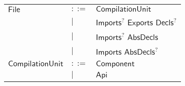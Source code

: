 







\begin{longtable}[l]{p{3cm}ll}
$\mathsf{File}$ &  $\mathsf{::=}$  & $\mathsf{CompilationUnit}$ \\
 & $\big|$ &  $\mathsf{Imports}$$^?$ $\mathsf{Exports}$ $\mathsf{Decls}$$^?$ \\
 & $\big|$ &  $\mathsf{Imports}$$^?$ $\mathsf{AbsDecls}$ \\
 & $\big|$ &  $\mathsf{Imports}$ $\mathsf{AbsDecls}$$^?$ \\
$\mathsf{CompilationUnit}$ &  $\mathsf{::=}$  & $\mathsf{Component}$ \\
 & $\big|$ &  $\mathsf{Api}$ \\
\end{longtable} \hfill 



